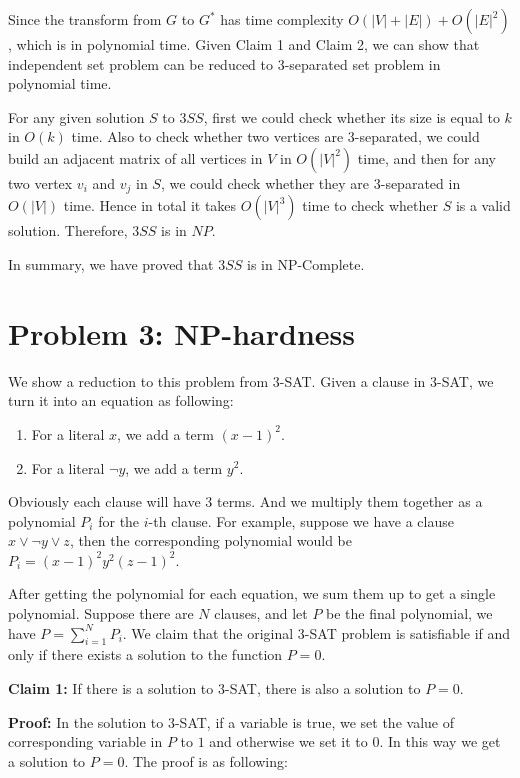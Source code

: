 \documentclass[paper=a4, fontsize=11pt]{scrartcl} %
\numberwithin{equation}{section} %
\numberwithin{figure}{section} %
\numberwithin{table}{section} %
\begin{document}
\vspace{0.2cm}
Since the transform from $G$ to $G^*$ has time complexity $O(|V| + |E|) + O(|E|^2)$,
which is in polynomial time.  
Given Claim 1 and Claim 2, we can show that independent set problem can be reduced to $3$-separated
set problem in polynomial time. 

For any given solution $S$ to $3SS$, first we could check whether 
its size is equal to $k$ in $O(k)$ time. Also to check whether two vertices are $3$-separated, we
could build an adjacent matrix of all vertices in $V$ in $O(|V|^2)$ time, and then for any two
vertex $v_i$ and $v_j$ in $S$, we could check whether they are $3$-separated in $O(|V|)$ time. Hence
in total it takes $O(|V|^3)$ time to check whether $S$ is a valid solution. Therefore, $3SS$ is in
$NP$.

In summary, we have proved that $3SS$ is in NP-Complete. 

\section*{Problem 3: NP-hardness}
We show a reduction to this problem from $3$-SAT. Given a clause in $3$-SAT, we turn it into an
equation as following:
\begin{enumerate}
  \item For a literal $x$, we add a term $(x-1)^2$.
  \item For a literal $\lnot y$, we add a term $y^2$.
\end{enumerate}
Obviously each clause will have $3$ terms. And we multiply them together as a polynomial $P_i$ for
the $i$-th clause.
For example, suppose we have a clause $x \lor \lnot y \lor z$, then the corresponding polynomial
would be $P_i = (x-1)^2 y^2 (z-1)^2$.

After getting the polynomial for each equation, we sum them up to get a single polynomial. Suppose
there are $N$ clauses, and let $P$ be the final polynomial, we have $P = \sum_{i=1}^{N} P_i$. We
claim that the original $3$-SAT problem is satisfiable if and only if there exists a solution to the
function $P = 0$.

\textbf{Claim 1:} If there is a solution to $3$-SAT, there is also a solution to $P = 0$.

\textbf{Proof:}
In the solution to $3$-SAT, if a variable is true, we set the value of corresponding variable in $P$
to $1$ and otherwise we set it to $0$. In this way we get a solution to $P = 0$. The proof is as
following:
\end{document}
